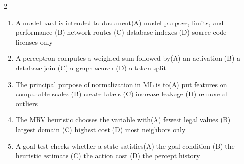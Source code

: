 \documentclass[a4paper]{article}
\begin{document}
\begin{multicols*}{2}
\begin{enumerate}[resume]
\item A model card is intended to document\newline\hspace*{0.6em}(A) model purpose, limits, and performance \quad (B) network routes \newline\hspace*{0.6em}(C) database indexes \quad (D) source code licenses only
\item A perceptron computes a weighted sum followed by\newline\hspace*{0.6em}(A) an activation \quad (B) a database join \newline\hspace*{0.6em}(C) a graph search \quad (D) a token split
\item The principal purpose of normalization in ML is to\newline\hspace*{0.6em}(A) put features on comparable scales \quad (B) create labels \newline\hspace*{0.6em}(C) increase leakage \quad (D) remove all outliers
\item The MRV heuristic chooses the variable with\newline\hspace*{0.6em}(A) fewest legal values \quad (B) largest domain \newline\hspace*{0.6em}(C) highest cost \quad (D) most neighbors only
\item A goal test checks whether a state satisfies\newline\hspace*{0.6em}(A) the goal condition \quad (B) the heuristic estimate \newline\hspace*{0.6em}(C) the action cost \quad (D) the percept history
\end{enumerate}
\end{multicols*}
\end{document}
